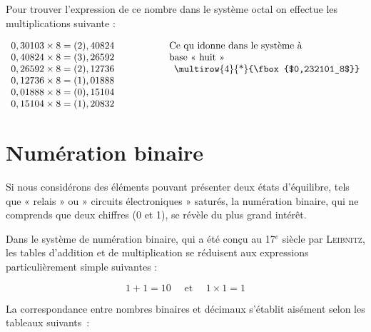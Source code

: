 Pour trouver l'expression de ce nombre dans le système octal on effectue les multiplications suivante : 

\[
\begin{array}{r@{\hspace*{2cm}}l}
0,30103 \times 8 = (2), 40824 & \text{Ce qu idonne dans le système à} \\
0,40824 \times 8 = (3), 26592 & \text{base « huit »} \\
0,26592 \times 8 = (2), 12736 & \multicolumn{1}{c}{$\multirow{4}{*}{\fbox{$0,232101_8$}}$}  \\
0,12736 \times 8 = (1), 01888   \\
0,01888 \times 8 = (0), 15104   \\
0,15104 \times 8 = (1), 20832  \\
\end{array}
\]

\newpage 


\section{Numération binaire}

Si nous considérons des éléments pouvant présenter deux états d'équilibre, tels que « relais » ou » circuits électroniques » saturés, la numération binaire, qui ne comprends que deux chiffres (0 et 1), se révèle du plus grand intérêt.

Dans le système de numération binaire, qui a été conçu au 17$^e$ siècle par \textsc{Leibnitz}, les tables d'addition et de multiplication se réduisent aux expressions particulièrement simple suivantes :

\[ 1 + 1 = 10 \quad \text{ et } \quad 1 \times 1 = 1 \]


La correspondance entre nombres binaires et décimaux s'établit aisément
selon les tableaux suivants~:

